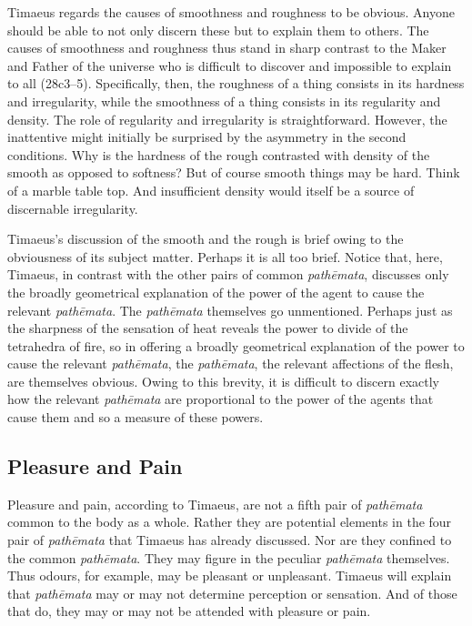 Timaeus regards the causes of smoothness and roughness to be obvious. Anyone should be able to not only discern these but to explain them to others. The causes of smoothness and roughness thus stand in sharp contrast to the Maker and Father of the universe who is difficult to discover and impossible to explain to all (28c3--5). Specifically, then, the roughness of a thing consists in its hardness and irregularity, while the smoothness of a thing consists in its regularity and density. The role of regularity and irregularity is straightforward. However, the inattentive might initially be surprised by the asymmetry in the second conditions. Why is the hardness of the rough contrasted with density of the smooth as opposed to softness? But of course smooth things may be hard. Think of a marble table top. And insufficient density would itself be a source of discernable irregularity.

Timaeus's discussion of the smooth and the rough is brief owing to the obviousness of its subject matter. Perhaps it is all too brief. Notice that, here, Timaeus, in contrast with the other pairs of common \emph{pathēmata}, discusses only the broadly geometrical explanation of the power of the agent to cause the relevant \emph{pathēmata}. The \emph{pathēmata} themselves go unmentioned. Perhaps just as the sharpness of the sensation of heat reveals the power to divide of the tetrahedra of fire, so in offering a broadly geometrical explanation of the power to cause the relevant \emph{pathēmata}, the \emph{pathēmata}, the relevant affections of the flesh, are themselves obvious. Owing to this brevity, it is difficult to discern exactly how the relevant \emph{pathēmata} are proportional to the power of the agents that cause them and so a measure of these powers.


\subsection{Pleasure and Pain} %
\label{sub:pleasure_and_pain}

Pleasure and pain, according to Timaeus, are not a fifth pair of \emph{pathēmata} common to the body as a whole. Rather they are potential elements in the four pair of \emph{pathēmata} that Timaeus has already discussed. Nor are they confined to the common \emph{pathēmata}. They may figure in the peculiar \emph{pathēmata} themselves. Thus odours, for example, may be pleasant or unpleasant. Timaeus will explain that \emph{pathēmata} may or may not determine perception or sensation. And of those that do, they may or may not be attended with pleasure or pain.

